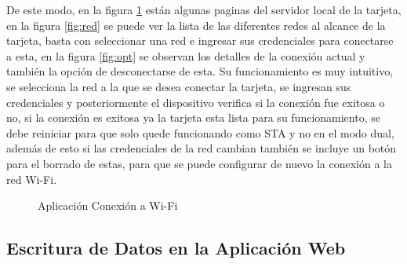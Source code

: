 De este modo, en la figura \ref{fig:wifi} están algunas paginas del servidor local de la tarjeta, en la figura \ref{fig:red} se puede ver la lista de las diferentes redes al alcance de la tarjeta, basta con seleccionar una red e ingresar sus credenciales para conectarse a esta, en la figura \ref{fig:opt} se observan los detalles de la conexión actual y también la opción de desconectarse de esta. Su funcionamiento es muy intuitivo, se selecciona la red a la que se desea conectar la tarjeta, se ingresan sus credenciales y posteriormente el dispositivo verifica si la conexión fue exitosa o no, si la conexión es exitosa ya la tarjeta esta lista para su funcionamiento, se debe reiniciar para que solo quede funcionando como STA y no en el modo dual, además de esto si las credenciales de la red cambian también se incluye un botón para el borrado de estas, para que se puede configurar de nuevo la conexión a la red Wi-Fi.

\begin{figure}[H]
	\centering
	\caption{Aplicación Conexión a Wi-Fi}
	\label{fig:wifi}
\end{figure}

\subsection{Escritura de Datos en la Aplicación Web}


